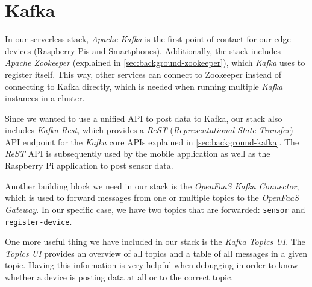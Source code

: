 \section{Kafka}

In our serverless stack, \textit{Apache Kafka} is the first point of contact for our edge devices
(Raspberry Pis and Smartphones). Additionally, the stack includes \textit{Apache Zookeeper}
(explained in \autoref{sec:background-zookeeper}), which \textit{Kafka} uses to register itself.
This way, other services can connect to Zookeeper instead of connecting to Kafka directly, which is
needed when running multiple \textit{Kafka} instances in a cluster.

Since we wanted to use a unified API to post data to Kafka, our stack also includes \textit{Kafka
Rest}, which provides a \textit{ReST} (\textit{Representational State Transfer}) API endpoint for
the \textit{Kafka} core APIs explained in \autoref{sec:background-kafka}. The \textit{ReST} API is
subsequently used by the mobile application as well as the Raspberry Pi application to post sensor
data.

Another building block we need in our stack is the \textit{OpenFaaS Kafka Connector}, which is used
to forward messages from one or multiple topics to the \textit{OpenFaaS Gateway}. In our specific
case, we have two topics that are forwarded: \texttt{sensor} and \texttt{register-device}.

One more useful thing we have included in our stack is the \textit{Kafka Topics UI}. The
\textit{Topics UI} provides an overview of all topics and a table of all messages in a given topic.
Having this information is very helpful when debugging in order to know whether a device is posting
data at all or to the correct topic.
